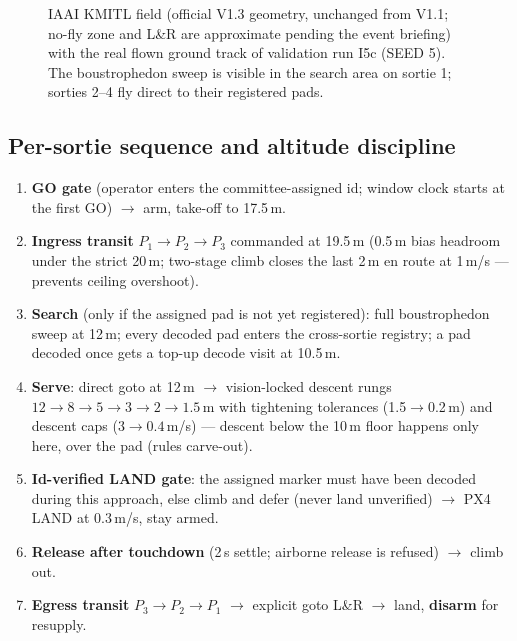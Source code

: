 \documentclass[11pt,a4paper]{article}
\begin{document}
\begin{figure}[h]
\caption{IAAI KMITL field (official V1.3 geometry, unchanged from V1.1; no-fly zone and L\&R are
approximate pending the event briefing) with the real flown ground track of
validation run I5c (SEED 5). The boustrophedon sweep is visible in the search
area on sortie 1; sorties 2--4 fly direct to their registered pads.}
\label{fig:map}
\end{figure}

\subsection{Per-sortie sequence and altitude discipline}
\begin{enumerate}[label=\arabic*., leftmargin=1.6em]
\item \textbf{GO gate} (operator enters the committee-assigned id; window clock
      starts at the first GO) $\rightarrow$ arm, take-off to 17.5\,m.
\item \textbf{Ingress transit} $P_1{\to}P_2{\to}P_3$ commanded at 19.5\,m
      (0.5\,m bias headroom under the strict 20\,m; two-stage climb closes the
      last 2\,m en route at 1\,m/s --- prevents ceiling overshoot).
\item \textbf{Search} (only if the assigned pad is not yet registered): full
      boustrophedon sweep at 12\,m; every decoded pad enters the cross-sortie
      registry; a pad decoded once gets a top-up decode visit at 10.5\,m.
\item \textbf{Serve}: direct goto at 12\,m $\rightarrow$ vision-locked descent
      rungs $12\to8\to5\to3\to2\to1.5$\,m with tightening tolerances
      (1.5$\to$0.2\,m) and descent caps ($3\to0.4$\,m/s) --- descent below the
      10\,m floor happens only here, over the pad (rules carve-out).
\item \textbf{Id-verified LAND gate}: the assigned marker must have been decoded
      during this approach, else climb and defer (never land unverified)
      $\rightarrow$ PX4 LAND at 0.3\,m/s, stay armed.
\item \textbf{Release after touchdown} (2\,s settle; airborne release is
      refused) $\rightarrow$ climb out.
\item \textbf{Egress transit} $P_3{\to}P_2{\to}P_1$ $\rightarrow$ explicit goto
      L\&R $\rightarrow$ land, \textbf{disarm} for resupply.
\end{enumerate}
\end{document}
